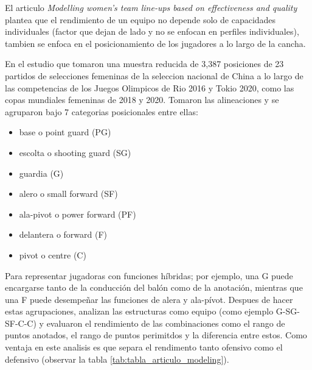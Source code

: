El articulo \textit{Modelling women’s team line-ups based
on effectiveness and quality} plantea que el rendimiento de un equipo no depende solo de capacidades individuales (factor que dejan de lado y no se enfocan en perfiles individuales), tambien se enfoca en el posicionamiento de los jugadores a lo largo de la cancha.

En el estudio que tomaron una muestra reducida de 3,387 posiciones de 23 partidos de selecciones femeninas de la seleccion nacional de China a lo largo de las competencias de los Juegos Olimpicos de Rio 2016 y Tokio 2020, como las copas mundiales femeninas de 2018 y 2020. Tomaron las alineaciones y se agruparon bajo 7 categorias posicionales entre ellas: 
\begin{itemize}
    \item base o point guard (PG)
    \item escolta o shooting guard (SG)
    \item guardia (G)
    \item alero o small forward (SF)
    \item ala-pivot o power forward (PF)
    \item delantera o forward (F)
    \item pivot o centre (C)
\end{itemize}
Para representar jugadoras con funciones híbridas; por ejemplo, una G puede encargarse tanto de la conducción del balón como de la anotación, mientras que una F puede desempeñar las funciones de alera y ala-pívot. Despues de hacer estas agrupaciones, analizan las estructuras como equipo (como ejemplo G-SG-SF-C-C) y evaluaron el rendimiento de las combinaciones como el rango de puntos anotados, el rango de puntos perimitdos y la diferencia entre estos. Como ventaja en este analisis es que separa el rendimento tanto ofensivo como el defensivo (observar la tabla \ref{tab:tabla_articulo_modeling}). 
